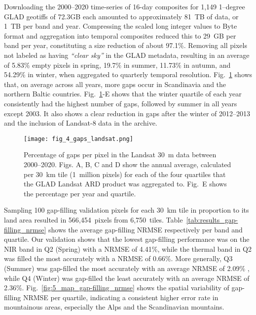 Downloading the 2000--2020 time-series of 16-day composites for 1,149 1--degree GLAD geotiffs of 72.3GB each amounted to approximately 81~TB of data, or 1~TB per band and year. Compressing the scaled long integer values to Byte format and aggregation into temporal composites reduced this to 29~GB per band per year, constituting a size reduction of about 97.1\%. Removing all pixels not labeled as having \emph{``clear sky''} in the GLAD metadata, resulting in an average of 5.83\% empty pixels in spring, 19.7\% in summer, 11.73\% in autumn, and 54.29\% in winter, when aggregated to quarterly temporal resolution. Fig.\@~\ref{fig:4_gaps_landsat} shows that, on average across all years, more gaps occur in Scandinavia and the northern Baltic countries. Fig.\@~\ref{fig:4_gaps_landsat}-E shows that the winter quartile of each year consistently had the highest number of gaps, followed by summer in all years except 2003. It also shows a clear reduction in gaps after the winter of 2012--2013 and the inclusion of Landsat-8 data in the archive. 

\begin{figure}[!hbt]
    \texttt{[image: fig\_4\_gaps\_landsat.png]}
    \caption{Percentage of gaps per pixel in the Landsat 30~m data between 2000--2020. Figs. A, B, C and D show the annual average, calculated per 30~km tile (1~million pixels) for each of the four quartiles that the GLAD Landsat ARD product was aggregated to. Fig.\@~E shows the percentage per year and quartile.}
    \label{fig:4_gaps_landsat}
\end{figure}

Sampling 100 gap-filling validation pixels for each 30~km tile in proportion to its land area resulted in 566,454~pixels from 6,750~tiles. Table\@~\ref{tab:results_gap-filling_nrmse} shows the average gap-filling NRMSE respectively per band and quartile. Our validation shows that the lowest gap-filling performance was on the NIR band in Q2 (Spring) with a NRMSE of 4.41\%, while the thermal band in Q2 was filled the most accurately with a NRMSE of 0.66\%. More generally, Q3 (Summer) was gap-filled the most accurately with an average NRMSE of 2.09\% , while Q4 (Winter) was gap-filled the least accurately with an average NRMSE of 2.36\%. Fig.\@~\ref{fig:5_map_gap-filling_nrmse} shows the spatial variability of gap-filling NRMSE per quartile, indicating a consistent higher error rate in mountainous areas, especially the Alps and the Scandinavian mountains.

